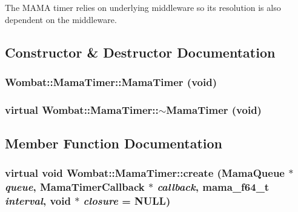 The MAMA timer relies on underlying middleware so its resolution is also dependent on the middleware. 

\subsection{Constructor \& Destructor Documentation}
\hypertarget{classWombat_1_1MamaTimer_ab882f603a9dc4107745161d0ad2073eb}{
\subsubsection[{MamaTimer}]{\setlength{\rightskip}{0pt plus 5cm}Wombat::MamaTimer::MamaTimer (void)}}
\label{classWombat_1_1MamaTimer_ab882f603a9dc4107745161d0ad2073eb}
\hypertarget{classWombat_1_1MamaTimer_a502a055afb936ed7cf743e22dfb5a758}{
\subsubsection[{$\sim$MamaTimer}]{\setlength{\rightskip}{0pt plus 5cm}virtual Wombat::MamaTimer::$\sim$MamaTimer (void)}}
\label{classWombat_1_1MamaTimer_a502a055afb936ed7cf743e22dfb5a758}


\subsection{Member Function Documentation}
\hypertarget{classWombat_1_1MamaTimer_a2d093ee2832a58fa2066165d81c33855}{
\subsubsection[{create}]{\setlength{\rightskip}{0pt plus 5cm}virtual void Wombat::MamaTimer::create ({\bf MamaQueue} $\ast$ {\em queue}, \/  {\bf MamaTimerCallback} $\ast$ {\em callback}, \/  mama\_\-f64\_\-t {\em interval}, \/  void $\ast$ {\em closure} = {\ttfamily NULL})}}
\label{classWombat_1_1MamaTimer_a2d093ee2832a58fa2066165d81c33855}


